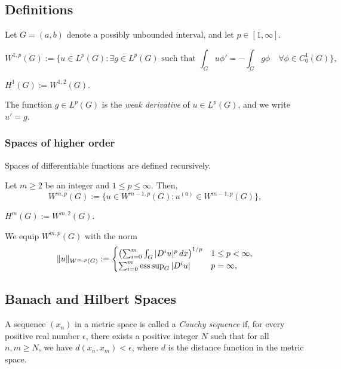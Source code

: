 \subsection{Definitions}

Let $G = (a, b)$ denote a possibly unbounded interval, and let $p \in [1, \infty]$.

\begin{definition}[$W^{1,p}(G)$]
\[
W^{1,p}(G) := \{ u \in L^p(G) : \exists g \in L^p(G) \text{ such that } \int_G u\phi' = -\int_G g\phi \quad \forall \phi \in C^1_0(G) \},
\]
\end{definition}

\begin{definition}
$H^1(G) := W^{1,2}(G)$.
\end{definition}

\begin{definition}
The function $g \in L^p(G)$ is the \textit{weak derivative} of $u \in L^p(G)$, and we write $u' = g$.
\end{definition}

\subsubsection{Spaces of higher order}

Spaces of differentiable functions are defined recursively.

\begin{definition}[$W^{m,p}(G)$]
Let $m \geq 2$ be an integer and $1 \leq p \leq \infty$. Then,
\[
W^{m,p}(G) := \{ u \in W^{m-1,p}(G) : u^{(0)} \in W^{m-1,p}(G) \},
\]
\end{definition}

\begin{definition}
$H^m(G) := W^{m,2}(G)$.
\end{definition}

We equip $W^{m,p}(G)$ with the norm
\[
\|u\|_{W^{m,p}(G)} :=
\begin{cases}
\left( \sum_{i=0}^m \int_G |D^iu|^p \, dx \right)^{1/p} & 1 \leq p < \infty, \\
\sum_{i=0}^m \operatorname*{ess\,sup}_{G} |D^iu| & p = \infty,
\end{cases}
\]

\subsection{Banach and Hilbert Spaces}

\begin{definition}
A sequence $(x_n)$ in a metric space is called a \textit{Cauchy sequence} if, for every positive real number $\epsilon$, there exists a positive integer $N$ such that for all $n, m \geq N$, we have $d(x_n, x_m) < \epsilon$, where $d$ is the distance function in the metric space.
\end{definition}


